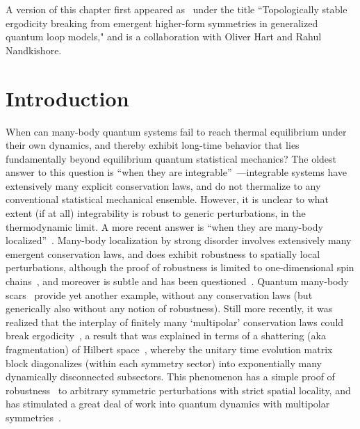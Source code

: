A version of this chapter first appeared as~\cite{Stahl2024Loops} under the title ``Topologically stable ergodicity breaking from emergent higher-form symmetries in generalized quantum loop models," and is a collaboration with Oliver Hart and Rahul Nandkishore.






\section{Introduction}

When can many-body quantum systems fail to reach thermal equilibrium under their own dynamics, and thereby exhibit long-time behavior that lies fundamentally beyond equilibrium quantum statistical mechanics? The oldest answer to this question is ``when they are integrable''~\cite{Baxter2016Exactly}---integrable systems have extensively many explicit conservation laws, and do not thermalize to any conventional statistical mechanical ensemble. However, it is unclear to what extent (if at all) integrability is robust to generic perturbations, in the thermodynamic limit. A more recent answer is ``when they are many-body localized''~\cite{Nandkishore2015MBL, Abanin2019MBL}. Many-body localization by strong disorder involves extensively many emergent conservation laws, and does exhibit robustness to spatially local perturbations, although the proof of robustness is limited to one-dimensional spin chains~\cite{Imbrie2016MBL}, and moreover is subtle and has been questioned~\cite{Sels2021Obstruction}. Quantum many-body scars~\cite{Shiraishi2017ETH, Moudgalya2018AKLT, Turner2018Scarred, Chandran2023Scars} provide yet another example, without any conservation laws (but generically also without any notion of robustness). Still more recently, it was realized that the interplay of finitely many `multipolar' conservation laws could break ergodicity~\cite{Pai2019Localization}, a result that was explained in terms of a shattering (aka fragmentation) of Hilbert space~\cite{Khemani2020Localization, Sala2020Fragmentation, Moudgalya2022Thermalization}, whereby the unitary time evolution matrix block diagonalizes (within each symmetry sector) into exponentially many dynamically disconnected subsectors. This phenomenon has a simple proof of robustness~\cite{Khemani2020Localization} to arbitrary symmetric perturbations with strict spatial locality, and has stimulated a great deal of work into quantum dynamics with multipolar symmetries~\cite{Rakovszky2020SLIOM, Yang2020Confinement, Khudorozhkov2022Fragmentation, Moudgalya2022Commutant, Yoshinaga2022Ising, Hart2022Shattering, Bulmash2023Multipole, Gromov2020Fracton, Iaconis2019Subdiffusion, Glorioso2022Breakdown, RichterPal2022, Iaconis2021Multipole, Glorioso2021Nonabelian, Grosvenor2021Hydrodynamics, Osborne2021FractonFluids, Feldmeier2020Anomalous, Sala2022Modulated, Hart2022Quasiconservation, Qi2023FractonMHD, Guo2022Fracton, Glorioso2023Goldstone}. 

